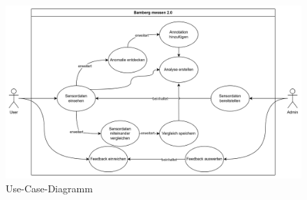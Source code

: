 \begin{figure}[t]
    \centering
    \includegraphics[width=1.5\textwidth]{figures/usecases.png}
    \decoRule
    \caption[Use-Case-Diagramm]{Use-Case-Diagramm}
    \label{fig:usecase_diagram}
\end{figure}